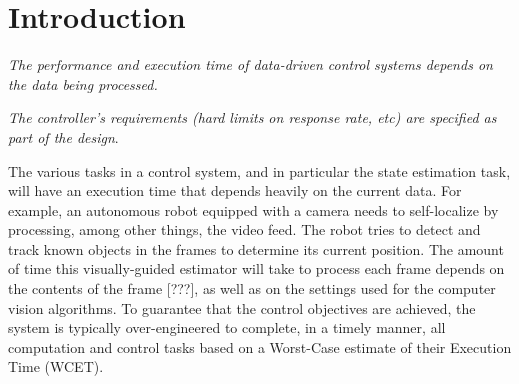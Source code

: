 \section{Introduction}
\label{introduction}

\emph{The performance and execution time of data-driven control systems depends on the data being processed.}

\emph{The controller's requirements (hard limits on response rate, etc) are specified as part of the design}.

The various tasks in a control system, and in particular the state estimation task, will have an execution time that depends heavily on the current data.
For example, an autonomous robot equipped with a camera needs to self-localize by processing, among other things, the video feed. 
The robot tries to detect and track known objects in the frames to determine its current position.
The amount of time this visually-guided estimator will take to process each frame depends on the contents of the frame [???], as well as on the settings used for the computer vision algorithms.
To guarantee that the control objectives are achieved, the system is typically over-engineered to complete, in a timely manner, all computation and control tasks based on a Worst-Case estimate of their Execution Time (WCET).

